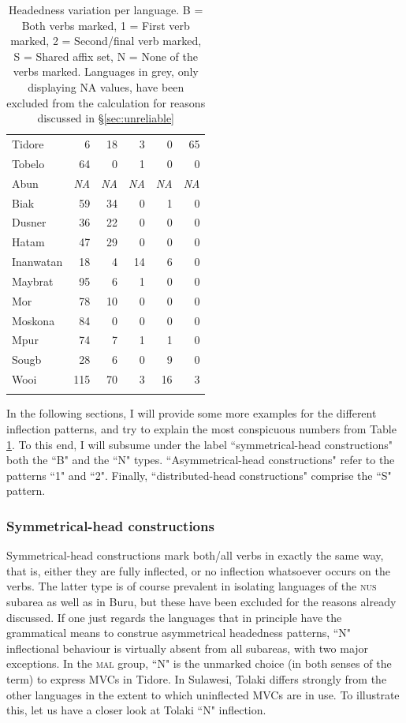 \begin{table}
\begin{tabular}{lrrrrr}
  Tidore & 6 & 18 & 3 & 0 & 65 \tabularnewline
  Tobelo &  64 &   0 &   1 &   0 &   0 \tabularnewline \hline 
  {\color{gray}Abun} & {\color{gray}\textit{NA}} & {\color{gray}\textit{NA}} & {\color{gray}\textit{NA}} &   {\color{gray}\textit{NA}} & {\color{gray}\textit{NA}} \tabularnewline
  Biak &  59 &  34 &   0 &   1 &   0 \tabularnewline
  Dusner &  36 &  22 &   0 &   0 &   0 \tabularnewline
  Hatam &  47 &  29 &   0 &   0 &   0 \tabularnewline
  Inanwatan &  18 &   4 &  14 &   6 &   0 \tabularnewline
  Maybrat &  95 &   6 &   1 &   0 &   0 \tabularnewline 
  Mor &  78 &  10 &   0 &   0 &   0 \tabularnewline
  Moskona &  84 &   0 &   0 &   0 &   0 \tabularnewline
  Mpur &  74 &   7 &   1 &   1 &   0 \tabularnewline
  Sougb &  28 &   6 &   0 &   9 &   0 \tabularnewline 
  Wooi & 115 &  70 &   3 &  16 &   3 \tabularnewline
   \lspbottomrule
\end{tabular}
\caption[Headedness variation per language]{Headedness variation per language. B = Both verbs marked, 1 = First verb marked, 2 = Second/final verb marked, S = Shared affix set, N = None of the verbs marked. Languages in grey, only displaying \textsc{NA} values, have been excluded from the calculation for reasons discussed in §\ref{sec:unreliable}}
\label{table:Headedness_per_lang}
\end{table}

In the following sections, I will provide some more examples for the different inflection patterns, and try to explain the most conspicuous numbers from Table \ref{table:Headedness_per_lang}. To this end, I will subsume under the label ``symmetrical-head constructions" both the ``B" and the ``N" types. ``Asymmetrical-head constructions" refer to the patterns ``1" and ``2". Finally, ``distributed-head constructions" comprise the ``S" pattern.

\subsubsection{Symmetrical-head constructions}\label{sec:symmetrical-head}

Symmetrical-head constructions mark both/all verbs in exactly the same way, that is, either they are fully inflected, or no inflection whatsoever occurs on the verbs. The latter type is of course prevalent in isolating languages of the \textsc{nus} subarea as well as in Buru, but these have been excluded for the reasons already discussed. If one just regards the languages that in principle have the grammatical means to construe asymmetrical headedness patterns, ``N" inflectional behaviour is virtually absent from all subareas, with two major exceptions. In the \textsc{mal} group, ``N" is the unmarked choice (in both senses of the term) to express MVCs in Tidore. In Sulawesi, Tolaki differs strongly from the other languages in the extent to which uninflected MVCs are in use. To illustrate this, let us have a closer look at Tolaki ``N" inflection.

